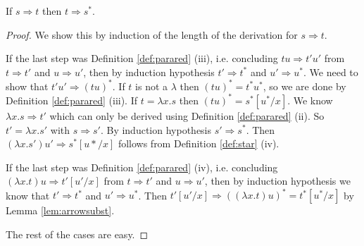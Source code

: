 \begin{boxlem} \label{lem:arrowstar}
    If $s \Rightarrow t$ then $t \Rightarrow s^*$.
\end{boxlem}
\begin{proof}
    We show this by induction of the length of the derivation for $s \Rightarrow t$.

    If the last step was Definition \ref{def:parared} (iii), i.e. concluding $tu \Rightarrow t'u'$ from $t \Rightarrow t'$ and $u \Rightarrow u'$, then by induction hypothesis $t' \Rightarrow t^*$ and $u' \Rightarrow u^*$.
    We need to show that $t'u' \Rightarrow (t u)^*$.
    If $t$ is not a $\lambda$ then $(tu)^* = t^*u^*$, so we are done by Definition \ref{def:parared} (iii).
    If $t = \lambda x. s$ then $(tu)^* = s^* [u^*/x]$.
    We know $\lambda x.s \Rightarrow t'$ which can only be derived using Definition \ref{def:parared} (ii).
    So $t' = \lambda x. s'$ with $s \Rightarrow s'$.
    By induction hypothesis $s' \Rightarrow s^*$.
    Then $(\lambda x. s') u' \Rightarrow s^* [u*/x]$ follows from Definition \ref{def:star} (iv).

    If the last step was Definition \ref{def:parared} (iv), i.e. concluding $(\lambda x.t) u \Rightarrow t'[u'/x]$ from $t \Rightarrow t'$ and $u \Rightarrow u'$, then by induction hypothesis we know that $t' \Rightarrow t^*$ and $u' \Rightarrow u^*$.
    Then $t'[u'/x] \Rightarrow ((\lambda x.t)u)^* = t^*[u^* /x]$ by Lemma \ref{lem:arrowsubst}.

    The rest of the cases are easy.
\end{proof}

